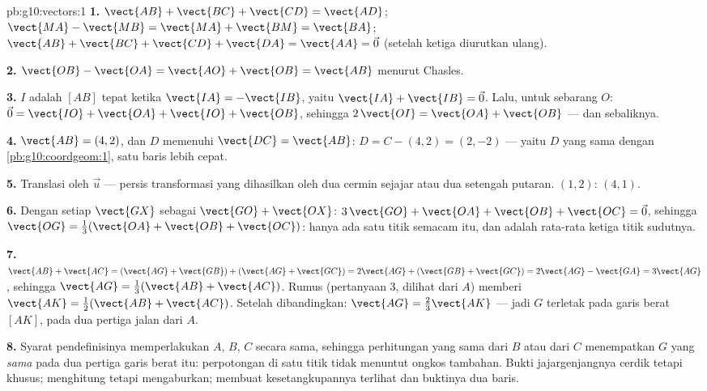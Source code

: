 \begin{solution}{pb:g10:vectors:1}
\textbf{1.} $\vect{AB} + \vect{BC} + \vect{CD} = \vect{AD}$;
\quad $\vect{MA} - \vect{MB} = \vect{MA} + \vect{BM} =
\vect{BA}$; \quad $\vect{AB} + \vect{BC} + \vect{CD} +
\vect{DA} = \vect{AA} = \vec 0$ (setelah  ketiga diurutkan ulang).

\textbf{2.} $\vect{OB} - \vect{OA} = \vect{AO} + \vect{OB} =
\vect{AB}$ menurut Chasles.

\textbf{3.} $I$ adalah  $[AB]$ tepat ketika
$\vect{IA} = -\vect{IB}$, yaitu
$\vect{IA} + \vect{IB} = \vec 0$. Lalu, untuk sebarang $O$:
$\vec 0 = \vect{IO} + \vect{OA} + \vect{IO} + \vect{OB}$, sehingga
$2\,\vect{OI} = \vect{OA} + \vect{OB}$ --- dan sebaliknya.

\textbf{4.} $\vect{AB} = (4, 2)$, dan $D$ memenuhi
$\vect{DC} = \vect{AB}$: $D = C - (4, 2) = (2, -2)$ --- yaitu
$D$ yang sama dengan \cref{pb:g10:coordgeom:1}, satu baris lebih cepat.

\textbf{5.} Translasi oleh  $\vec u$ --- persis
transformasi yang dihasilkan oleh dua cermin sejajar atau dua
setengah putaran.  $(1, 2)$: $(4, 1)$.

\textbf{6.} Dengan  setiap $\vect{GX}$ sebagai
$\vect{GO} + \vect{OX}$:
$3\,\vect{GO} + \vect{OA} + \vect{OB} + \vect{OC} = \vec 0$,
sehingga $\vect{OG} = \frac13(\vect{OA} + \vect{OB} + \vect{OC})$:
hanya ada satu titik semacam itu, dan  adalah rata-rata
 ketiga titik sudutnya.

\textbf{7.} $\vect{AB} + \vect{AC} =
(\vect{AG} + \vect{GB}) + (\vect{AG} + \vect{GC})
= 2\vect{AG} + (\vect{GB} + \vect{GC})
= 2\vect{AG} - \vect{GA} = 3\vect{AG}$, sehingga
$\vect{AG} = \frac13(\vect{AB} + \vect{AC})$. Rumus  (pertanyaan 3, dilihat dari $A$) memberi
$\vect{AK} = \frac12(\vect{AB} + \vect{AC})$. Setelah dibandingkan:
$\vect{AG} = \frac23\vect{AK}$ --- jadi $G$ terletak pada garis berat
$[AK]$, pada dua pertiga jalan dari $A$.

\textbf{8.} Syarat pendefinisinya memperlakukan $A$, $B$, $C$
secara sama, sehingga perhitungan yang sama dari $B$ atau dari $C$
menempatkan $G$ yang \emph{sama} pada dua pertiga garis berat itu:
perpotongan di satu titik tidak menuntut ongkos tambahan. Bukti
jajargenjangnya cerdik tetapi khusus;  menghitung tetapi
mengaburkan;  membuat kesetangkupannya terlihat dan buktinya dua baris.


\end{solution}
